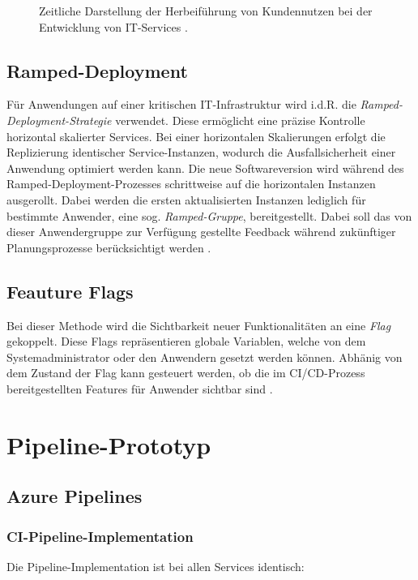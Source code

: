\begin{center}
	\begin{figure}[H]
		\centering
		\caption[]{Zeitliche Darstellung der Herbeiführung von Kundennutzen bei der Entwicklung von IT-Services \cite[9]{Halstenberg.2020}.}
		\label{fig:TTM}
	\end{figure}
\end{center}
\vspace*{-15mm}


\subsection{Ramped-Deployment}
Für Anwendungen auf einer kritischen IT-Infrastruktur wird i.d.R. die \textit{Ramped-Deployment-Strategie} verwendet. Diese ermöglicht eine präzise Kontrolle horizontal skalierter Services. Bei einer horizontalen Skalierungen erfolgt die Replizierung identischer Service-Instanzen, wodurch die Ausfallsicherheit einer Anwendung optimiert werden kann. Die neue Softwareversion wird während des Ramped-Deployment-Prozesses schrittweise auf die horizontalen Instanzen ausgerollt. Dabei werden die ersten aktualisierten Instanzen lediglich für bestimmte Anwender, eine sog. \textit{Ramped-Gruppe}, bereitgestellt. Dabei soll das von dieser Anwendergruppe zur Verfügung gestellte Feedback während zukünftiger Planungsprozesse berücksichtigt werden \cite{Ugochi.20220503}.


\subsection{Feauture Flags}
Bei dieser Methode wird die Sichtbarkeit neuer Funktionalitäten an eine \textit{Flag} gekoppelt. Diese Flags repräsentieren globale Variablen, welche von dem Systemadministrator oder den Anwendern gesetzt werden können. Abhänig von dem Zustand der Flag kann gesteuert werden, ob die im CI/CD-Prozess bereitgestellten Features für Anwender sichtbar sind \cite{Atlassian.20230409}.

\newpage
\section{Pipeline-Prototyp}
\subsection{Azure Pipelines}
\subsubsection{CI-Pipeline-Implementation}
Die Pipeline-Implementation ist bei allen Services identisch:\\

